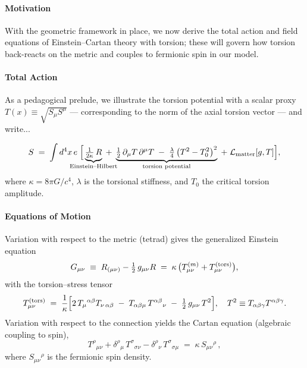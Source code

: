 \documentclass{article}
\begin{document}
\paragraph{Motivation}
With the geometric framework in place, we now derive the total action and field equations of Einstein–Cartan theory with torsion; these will govern how torsion back-reacts on the metric and couples to fermionic spin in our model.

\paragraph{Total Action}
As a pedagogical prelude, we illustrate the torsion potential with a scalar proxy $T(x) \equiv \sqrt{S_\mu S^\mu}$ — corresponding to the norm of the axial torsion vector — and write...

\begin{equation}
  S \;=\;\int d^4x\,e\;\Big[
    \underbrace{\tfrac1{2\kappa}\,R}_{\mathclap{\text{Einstein–Hilbert}}}
  \;+\;
    \underbrace{\tfrac12\,\partial_\mu T\,\partial^\mu T
    \;-\;\tfrac{\lambda}{4}\,\bigl(T^2 - T_0^2\bigr)^2}_{\mathclap{\text{torsion potential}}}
  \;+\;\mathcal L_{\rm matter}[g,T]
  \Big] ,
\end{equation}
where 
\(\kappa=8\pi G/c^4\), \(\lambda\) is the torsional stiffness, and \(T_0\) the critical torsion amplitude.

\paragraph{Equations of Motion}
Variation with respect to the metric (tetrad) gives the generalized Einstein equation
\begin{equation}\label{eq:auto6}
G_{\mu\nu}\;\equiv\;R_{(\mu\nu)} - \tfrac12\,g_{\mu\nu}R
  \;=\;\kappa\,\bigl(T^{(m)}_{\mu\nu} + T^{(\rm tors)}_{\mu\nu}\bigr),
\end{equation}
with the torsion–stress tensor
\begin{equation}\label{eq:auto7}
T^{(\rm tors)}_{\mu\nu}
  \;=\;\frac1\kappa\Bigl[
    2\,T_{\mu}{}^{\alpha\beta}T_{\nu\,\alpha\beta}
    \;-\;T_{\alpha\beta\mu}\,T^{\alpha\beta}{}_{\nu}
    \;-\;\tfrac12\,g_{\mu\nu}\,T^2
  \Bigr] ,
  \quad
  T^2\equiv T_{\alpha\beta\gamma}T^{\alpha\beta\gamma}.
\end{equation}
Variation with respect to the connection yields the Cartan equation (algebraic coupling to spin),
\begin{equation}\label{eq:auto8}
T^\rho{}_{\mu\nu}
  +\delta^\rho{}_\mu\,T^\sigma{}_{\sigma\nu}
  -\delta^\rho{}_\nu\,T^\sigma{}_{\sigma\mu}
  \;=\;
  \kappa\,S_{\mu\nu}{}^{\rho}\,,
\end{equation}
where \(S_{\mu\nu}{}^\rho\) is the fermionic spin density.
\end{document}
